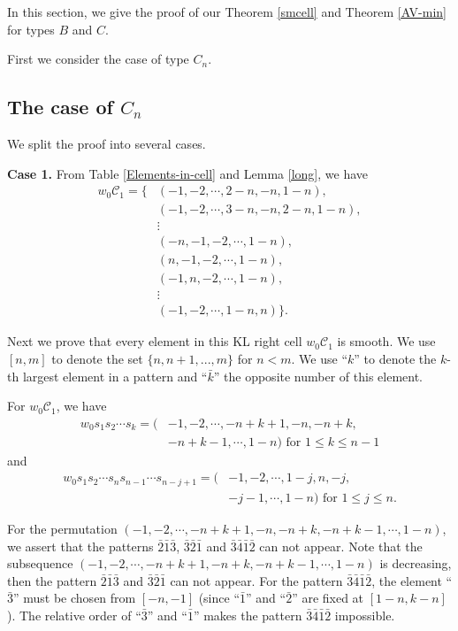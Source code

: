 \documentclass[11pt, reqno]{amsart}
\theoremstyle{definition}
\numberwithin{equation}{section}
\begin{document}
In this section, we give the proof of our Theorem \ref{smcell} and Theorem \ref{AV-min} for types $B$ and $C$.


First we consider the case of type $C_n$.

\subsection{The case of $C_n$}We split the proof into several cases.

{\bf Case 1.} From Table \ref{Elements-in-cell} and Lemma \ref{long}, we have 
\begin{align*}
    w_0\mathcal{C}_1=\{&(-1,-2,\cdots,2-n,-n,1-n),\\
    &(-1,-2,\cdots,3-n,-n,2-n,1-n),\\
	&\vdots\\
    &(-n,-1,-2,\cdots,1-n),\\
	&(n,-1,-2,\cdots,1-n),\\
	&(-1,n,-2,\cdots,1-n),\\
	&\vdots\\
	&(-1,-2,\cdots,1-n,n)\}.
\end{align*}



Next we prove that every element in this KL right cell $w_0\mathcal{C}_1$ is smooth. We use $[n, m]$ to denote the set $\{n, n + 1, ..., m\}$ for $n < m$. We use
“$k$” to denote the $k$-th largest element in a pattern and “$\bar{k}$” the opposite number of this element.

For $w_0\mathcal{C}_1$, we have 
\begin{align*}
    w_0s_1s_2\cdots s_k=(&-1,-2,\cdots,-n+k+1,-n,-n+k,\\&-n+k-1,\cdots,1-n)\text{~for~} 1\leq k\leq n-1
\end{align*}
 and 
 \begin{align*}
     w_0s_1s_2\cdots s_ns_{n-1}\cdots s_{n-j+1}=(&-1,-2,\cdots,1-j,n,-j,\\&-j-1,\cdots,1-n)\text{~for~}1\leq j\leq n.
 \end{align*}
 
 For the permutation $(-1,-2,\cdots,-n+k+1,-n,-n+k,-n+k-1,\cdots,1-n)$, we assert that the patterns $\bar{2}\bar{1}\bar{3}$, $\bar{3}\bar{2}\bar{1}$ and $\bar{3}\bar{4}\bar{1}\bar{2}$ can not appear. Note that the subsequence $(-1,-2,\cdots,-n+k+1,-n+k,-n+k-1,\cdots,1-n)$ is decreasing, then the pattern $\bar{2}\bar{1}\bar{3}$ and $\bar{3}\bar{2}\bar{1}$ can not appear. For the pattern $\bar{3}\bar{4}\bar{1}\bar{2}$, the element “$\bar{3}$” 
must be chosen from $[-n,-1]$ (since “$\bar{1}$” and “$\bar{2}$” are fixed at $[1-n,k-n]$). The relative order of “$\bar{3}$” and “$\bar{1}$” makes the pattern $\bar{3}\bar{4}\bar{1}\bar{2}$  impossible. 
\end{document}
